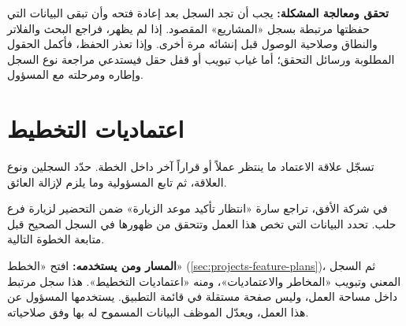 \textbf{تحقق ومعالجة المشكلة:} يجب أن تجد السجل بعد إعادة فتحه وأن تبقى البيانات التي حفظتها مرتبطة بسجل «المشاريع» المقصود. إذا لم يظهر، فراجع البحث والفلاتر والنطاق وصلاحية الوصول قبل إنشائه مرة أخرى. وإذا تعذر الحفظ، فأكمل الحقول المطلوبة ورسائل التحقق؛ أما غياب تبويب أو قفل حقل فيستدعي مراجعة نوع السجل وإطاره ومرحلته مع المسؤول.

\clearpage
\section{اعتماديات التخطيط}
\label{sec:projects-feature-planning-dependencies}

تسجّل علاقة الاعتماد ما ينتظر عملاً أو قراراً آخر داخل الخطة. حدّد السجلين ونوع العلاقة، ثم تابع المسؤولية وما يلزم لإزالة العائق.

\begin{rcnote}
في شركة الأفق، تراجع سارة «انتظار تأكيد موعد الزيارة» ضمن التحضير لزيارة فرع حلب. تحدد البيانات التي تخص هذا العمل وتتحقق من ظهورها في السجل الصحيح قبل متابعة الخطوة التالية.
\end{rcnote}

\textbf{المسار ومن يستخدمه:} افتح «الخطط» (\ref{sec:projects-feature-plans})، ثم السجل المعني وتبويب «المخاطر والاعتماديات»، ومنه «اعتماديات التخطيط». هذا سجل مرتبط داخل مساحة العمل، وليس صفحة مستقلة في قائمة التطبيق. يستخدمها المسؤول عن هذا العمل، ويعدّل الموظف البيانات المسموح له بها وفق صلاحياته.

